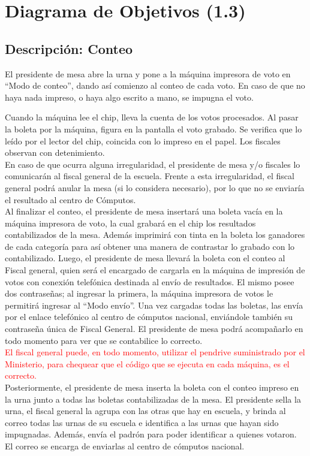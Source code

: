 \section{Diagrama de Objetivos (1.3)}

\subsection{Descripci\'on: Conteo}


El presidente de mesa abre la urna y pone a la máquina impresora de voto en “Modo de conteo”, dando así comienzo al conteo de cada voto. En caso de que no haya nada impreso, o haya algo escrito a mano, se impugna el voto.

Cuando la máquina lee el chip, lleva la cuenta de los votos procesados. Al pasar la boleta por la máquina, figura en la pantalla el voto grabado. Se verifica que lo leído por el lector del chip, coincida con lo impreso en el papel. Los fiscales observan con detenimiento.\\

En caso de que ocurra alguna irregularidad, el presidente de mesa y/o fiscales lo comunicarán al fiscal general de la escuela. Frente a esta irregularidad, el fiscal general podrá anular la mesa (si lo considera necesario), por lo que no se enviaría el resultado al centro de Cómputos.\\

Al finalizar el conteo, el presidente de mesa insertará una boleta vacía en la máquina impresora de voto, la cual grabará en el chip los resultados contabilizados de la mesa. Además imprimirá con tinta en la boleta los ganadores de cada categoría para así obtener una manera de contrastar lo grabado con lo contabilizado.
Luego, el presidente de mesa llevará la boleta con el conteo al Fiscal general, quien será el encargado de cargarla en la máquina de impresión de votos con conexión telefónica destinada al envío de resultados. El mismo posee dos contraseñas; al ingresar la primera, la máquina impresora de votos le permitirá ingresar al “Modo envío”. Una vez cargadas todas las boletas, las envía por el enlace telefónico al centro de cómputos nacional, enviándole también su contraseña única de Fiscal General. El presidente de mesa podrá acompañarlo en todo momento para ver que se contabilice lo correcto.\\
\textcolor{red}{El fiscal general puede, en todo momento, utilizar el pendrive suministrado por el Ministerio, para chequear que el código que se ejecuta en cada máquina, es el correcto.}\\
Posteriormente, el presidente de mesa inserta la boleta con el conteo impreso en la urna junto a todas las boletas contabilizadas de la mesa. El presidente sella la urna, el fiscal general la agrupa con las otras que hay en escuela, y brinda al correo todas las urnas de su escuela e identifica a las urnas que hayan sido impugnadas. Además, envía el padrón para poder identificar a quienes votaron. El correo se encarga de enviarlas al centro de cómputos nacional.\\

